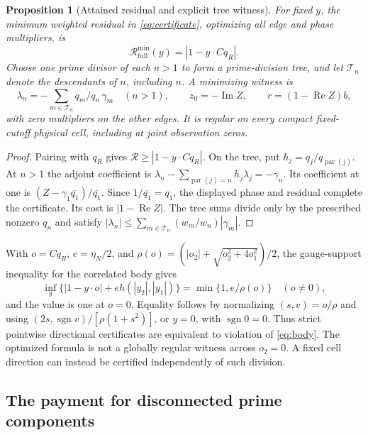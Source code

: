 \documentclass[11pt]{article}
\newtheorem{proposition}[theorem]{Proposition}
\theoremstyle{definition}
\theoremstyle{remark}
\newcommand{\Rea}{\operatorname{Re}}
\newcommand{\Ima}{\operatorname{Im}}
\begin{document}
\begin{proposition}[Attained residual and explicit tree witness]
\label{prop:sharp-residual}
For fixed $y$, the minimum weighted residual in
\eqref{eq:certificate}, optimizing all edge and phase multipliers, is
\begin{equation}
 \mathcal R_{\mathrm{full}}^{\min}(y)=|1-y\cdot Cq_R|.
 \label{eq:sharp-residual}
\end{equation}
Choose one prime divisor of each $n>1$ to form a prime-division tree,
and let $\mathcal T_n$ denote the descendants of $n$, including $n$.
A minimizing witness is
\begin{equation}
 \lambda_n=-\sum_{m\in\mathcal T_n}
       \overline{q_m/q_n}\,\gamma_m\quad(n>1),\qquad
 z_0=-\Ima Z,\qquad r=(1-\Rea Z)b,
 \label{eq:tree-witness}
\end{equation}
with zero multipliers on the other edges. It is regular on every compact
fixed-cutoff physical cell, including at joint observation zeros.
\end{proposition}
\begin{proof}
Pairing with $q_R$ gives $\mathcal R\ge|1-y\cdot Cq_R|$. On the tree,
put $h_j=q_j/q_{\operatorname{par}(j)}$. At $n>1$ the adjoint coefficient is
$\lambda_n-\sum_{\operatorname{par}(j)=n}\overline{h_j}\lambda_j
=-\gamma_n$. Its coefficient at one is
$(Z-\gamma_1\overline{q_1})/\overline{q_1}$.
Since $1/\overline{q_1}=q_1$, the displayed phase and residual complete
the certificate. Its cost is $|1-\Rea Z|$. The tree sums divide only by
the prescribed nonzero $q_n$ and satisfy
$|\lambda_n|\le\sum_{m\in\mathcal T_n}(w_m/w_n)|\gamma_m|$.
\end{proof}

With $o=Cq_R$, $e=\eta_N/2$, and
$\rho(o)=(|o_2|+\sqrt{o_2^2+4o_1^2})/2$, the gauge-support inequality
for the correlated body gives
\begin{equation}
 \inf_y\{|1-y\cdot o|+e h(|y_2|,|y_1|)\}
 =\min\{1,e/\rho(o)\}\quad(o\ne0),
 \label{eq:sharp-directional}
\end{equation}
and the value is one at $o=0$. Equality follows by normalizing
$(s,v)=o/\rho$ and using
$(2s,\operatorname{sgn}v)/[\rho(1+s^2)]$, or $y=0$, with
$\operatorname{sgn}0=0$.
Thus strict pointwise directional certificates are equivalent to
violation of \eqref{eq:body}. The optimized formula is not a globally
regular witness across $o_2=0$. A fixed cell direction can instead be
certified independently of such division.

\subsection{The payment for disconnected prime components}
\end{document}
